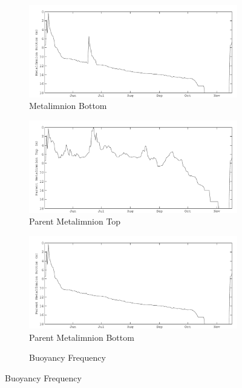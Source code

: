 \begin{figure}
\begin{subfigure}{\lafigsize}
		\end{subfigure}
		\begin{subfigure}{\lafigsize}
			\caption{Metalimnion Bottom}
			\includegraphics[width=\textwidth]{figures/Sparkling_metaB.pdf}
		\end{subfigure}
		\begin{subfigure}{\lafigsize}
			\caption{Parent Metalimnion Top}
			\includegraphics[width=\textwidth]{figures/Sparkling_SmetaT.pdf}
		\end{subfigure}
		\begin{subfigure}{\lafigsize}
			\caption{Parent Metalimnion Bottom}
			\includegraphics[width=\textwidth]{figures/Sparkling_SmetaB.pdf}
		\end{subfigure}
		\begin{subfigure}{\lafigsize}
			\caption{Buoyancy Frequency}

\end{subfigure}
\end{figure}
